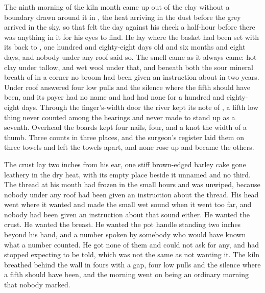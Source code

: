 
The ninth morning of the kiln month came up out of the clay without a boundary drawn around it in , the heat arriving in the dust before the grey arrived in the sky, so that  felt the day against his cheek a half-hour before there was anything in it for his eyes to find. He lay where the basket had been set with its back to , one hundred and eighty-eight days old and six months and eight days, and nobody under any roof said so. The smell came as it always came: hot clay under tallow, and wet wool under that, and beneath both the sour mineral breath of  in a corner no broom had been given an instruction about in two years. Under  roof  answered four low pulls and the silence where the fifth should have been, and its payer had no name and had had none for a hundred and eighty-eight days. Through the finger's-width door the river kept its note of , a fifth low thing never counted among the hearings and never made to stand up as a seventh. Overhead the boards kept four nails, four, and a knot the width of a thumb. Three counts in three places, and the surgeon's register laid them on three towels and left the towels apart, and none rose up and became the others.

The crust lay two inches from his ear, one stiff brown-edged barley cake gone leathery in the dry heat, with its empty place beside it unnamed and no third. The thread at his mouth had frozen in the small hours and was unwiped, because nobody under any roof had been given an instruction about the thread. His head went where it wanted and made the small wet sound when it went too far, and nobody had been given an instruction about that sound either. He wanted the crust. He wanted the breast. He wanted the pot handle standing two inches beyond his hand, and a number spoken by somebody who would have known what a number counted. He got none of them and could not ask for any, and had stopped expecting to be told, which was not the same as not wanting it. The kiln breathed behind the wall in fours with a gap, four low pulls and the silence where a fifth should have been, and the morning went on being an ordinary morning that nobody marked.

